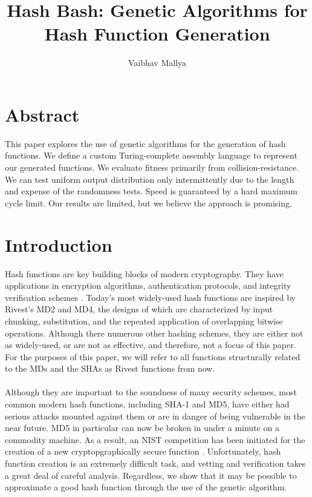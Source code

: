 \documentclass{article}
\begin{document}
\title{Hash Bash: Genetic Algorithms for Hash Function Generation}
\author{Vaibhav Mallya}
\maketitle
\section{Abstract}


This paper explores the use of genetic algorithms for the generation of hash functions. We define a custom Turing-complete assembly language to represent our generated functions. We evaluate fitness primarily from collision-resistance. We can test uniform output distribution only intermittently due to the length and expense of the randomness tests. Speed is guaranteed by a hard maximum cycle limit. Our results are limited, but we believe the approach is promising.

\section{Introduction}
Hash functions are key building blocks of modern cryptography. They have applications in encryption algorithms, authentication protocols, and integrity verification schemes \cite{Cohen}. Today's most widely-used hash functions are inspired by Rivest's MD2 \cite{RivestMD2} and MD4, the designs of which are characterized by input chunking, substitution, and the repeated application of overlapping bitwise operations. Although there numerous other hashing schemes, they are either not as widely-used, or are not as effective, and therefore, not a focus of this paper. For the purposes of this paper, we will refer to all functions structurally related to the MDs and the SHAs as Rivest functions from now.

\paragraph{}
Although they are important to the soundness of many security schemes, most common modern hash functions, including SHA-1 and MD5, have either had serious attacks mounted against them or are in danger of being vulnerable in the near future.
MD5 in particular can now be broken in under a minute on a commodity machine. \cite{cryptoeprint:2005:067} As a result, an NIST competition has been initiated for the creation of a new cryptopgraphically secure function \cite{NISTComp}. Unfortunately, hash function creation is an extremely difficult task, and vetting and verification takes a great deal of careful analysis.
Regardless, we show that it may be possible to approximate a good hash function through the use of the genetic algorithm.
\end{document}

